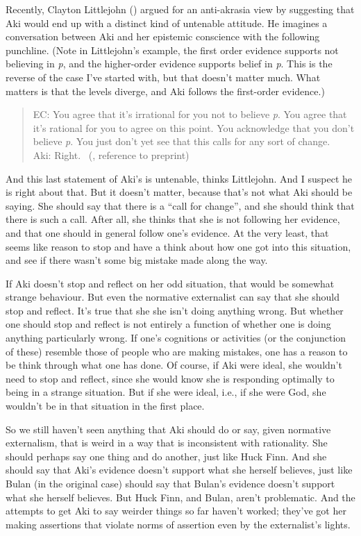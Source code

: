 \documentclass[
  10pt,
  letterpaper,
  twoside]{scrbook}
\begin{document}
Recently, Clayton Littlejohn ()
argued for an anti-akrasia view by suggesting that {Aki} would end up
with a distinct kind of untenable attitude. He imagines a conversation
between {Aki} and her epistemic conscience with the following punchline.
(Note in Littlejohn's example, the first order evidence supports not
believing in \emph{p}, and the higher-order evidence supports belief in
\emph{p}. This is the reverse of the case I've started with, but that
doesn't matter much. What matters is that the levels diverge, and Aki
follows the first-order evidence.)

\begin{quote}
EC: You agree that it's irrational for you not to believe \emph{p}. You
agree that it's rational for you to agree on this point. You acknowledge
that you don't believe \emph{p}. You just don't yet see that this calls
for any sort of change.\\
{Aki}: Right. ~(,
reference to preprint)
\end{quote}

And this last statement of {Aki}'s is untenable, thinks Littlejohn. And
I suspect he is right about that. But it doesn't matter, because that's
not what {Aki} should be saying. She should say that there is a ``call
for change'', and she should think that there is such a call. After all,
she thinks that she is not following her evidence, and that one should
in general follow one's evidence. At the very least, that seems like
reason to stop and have a think about how one got into this situation,
and see if there wasn't some big mistake made along the way.

If {Aki} doesn't stop and reflect on her odd situation, that would be
somewhat strange behaviour. But even the normative externalist can say
that she should stop and reflect. It's true that she she isn't doing
anything wrong. But whether one should stop and reflect is not entirely
a function of whether one is doing anything particularly wrong. If one's
cognitions or activities (or the conjunction of these) resemble those of
people who are making mistakes, one has a reason to be think through
what one has done. Of course, if {Aki} were ideal, she wouldn't need to
stop and reflect, since she would know she is responding optimally to
being in a strange situation. But if she were ideal, i.e., if she were
God, she wouldn't be in that situation in the first place.

So we still haven't seen anything that {Aki} should do or say, given
normative externalism, that is weird in a way that is inconsistent with
rationality. She should perhaps say one thing and do another, just like
{Huck} Finn. And she should say that {Aki}'s evidence doesn't support
what she herself believes, just like {Bulan} (in the original case)
should say that {Bulan}'s evidence doesn't support what she herself
believes. But {Huck} Finn, and {Bulan}, aren't problematic. And the
attempts to get {Aki} to say weirder things so far haven't worked;
they've got her making assertions that violate norms of assertion even
by the externalist's lights.
\end{document}
